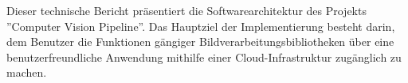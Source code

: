 Dieser technische Bericht präsentiert die Softwarearchitektur des Projekts ''Computer Vision Pipeline''. Das Hauptziel der Implementierung besteht darin, dem Benutzer die Funktionen gängiger Bildverarbeitungsbibliotheken über eine benutzerfreundliche Anwendung mithilfe einer Cloud-Infrastruktur zugänglich zu machen. 